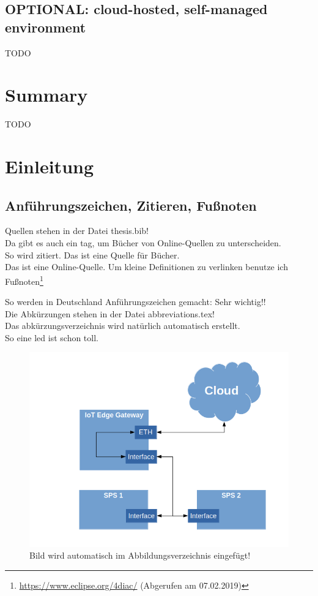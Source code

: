 \section{OPTIONAL: cloud-hosted, self-managed environment}
TODO

\chapter{Summary}
TODO




\chapter{Einleitung}
\section{Anführungszeichen, Zitieren, Fußnoten} 
\label{kap:beschda}
Quellen stehen in der Datei thesis.bib!\\
Da gibt es auch ein tag, um Bücher von Online-Quellen zu unterscheiden.\\

So wird zitiert\cite{booktest}. Das ist eine Quelle für Bücher. \\
Das ist eine Online-Quelle\cite{wikimoscow}.
Um kleine Definitionen zu verlinken benutze ich Fußnoten\footnote{\url{ https://www.eclipse.org/4diac/} (Abgerufen am 07.02.2019)}

So werden in Deutschland Anführungszeichen gemacht: \glqq Sehr wichtig!!\grqq{}  \\

Die Abkürzungen stehen in der Datei abbreviations.tex! \\
Das abkürzungsverzeichnis wird natürlich automatisch erstellt.\\

So eine \gls{led} ist schon toll.

\begin{figure}[H]
\includegraphics[scale=0.5]{pictures/GatewayKommunikation.png} 
\caption{Bild wird automatisch im Abbildungsverzeichnis eingefügt!}
\label{fig:gateway}
\end{figure}


